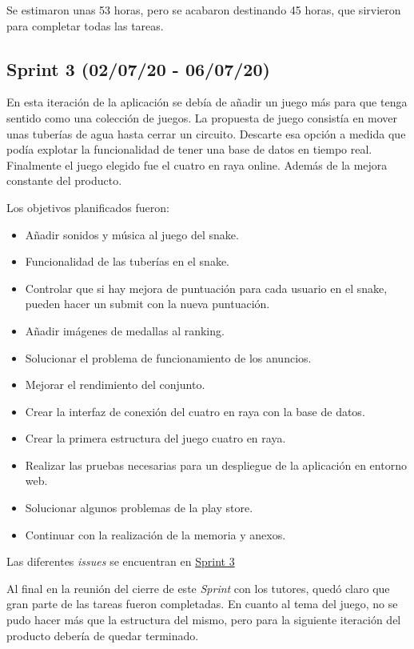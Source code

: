 Se estimaron unas 53 horas, pero se acabaron destinando 45 horas, que sirvieron para completar todas las tareas.

\subsection{Sprint 3 (02/07/20 - 06/07/20)}\label{sprint-3-020720---070720}
En esta iteración de la aplicación se debía de añadir un juego más para que tenga sentido como una colección de juegos. La propuesta de juego consistía en mover unas tuberías de agua hasta cerrar un circuito. Descarte esa opción a medida que podía explotar la funcionalidad de tener una base de datos en tiempo real. Finalmente el juego elegido fue el cuatro en raya online. Además de la mejora constante del producto.

Los objetivos planificados fueron:
\begin{itemize}
	\item Añadir sonidos y música al juego del snake.
	\item Funcionalidad de las tuberías en el snake.
	\item Controlar que si hay mejora de puntuación para cada usuario en el snake, pueden hacer un submit con la nueva puntuación.
	\item Añadir imágenes de medallas al ranking.
	\item Solucionar el problema de funcionamiento de los anuncios.
	\item Mejorar el rendimiento del conjunto.
	\item Crear la interfaz de conexión del cuatro en raya con la base de datos.
	\item Crear la primera estructura del juego cuatro en raya.
	\item Realizar las pruebas necesarias para un despliegue de la aplicación en entorno web.
	\item Solucionar algunos problemas de la play store.
	\item Continuar con la realización de la memoria y anexos.
\end{itemize}

Las diferentes \emph{issues} se encuentran en \href{https://github.com/scc0034/flutter_serpiente/milestone/3?closed=1}{Sprint 3}


Al final en la reunión del cierre de este \emph{Sprint} con los tutores, quedó claro que gran parte de las tareas fueron completadas. En cuanto al tema del juego, no se pudo hacer más que la estructura del mismo, pero para la siguiente iteración del producto debería de quedar terminado.

